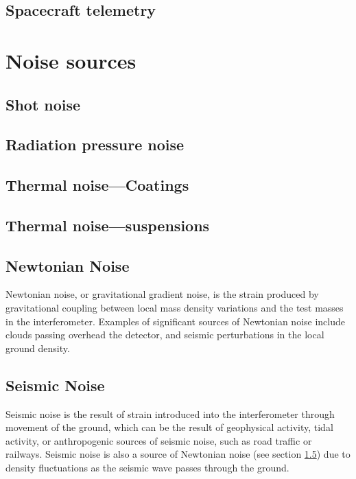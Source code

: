 \documentclass{kentigern}
\begin{document}
\subsection{Spacecraft telemetry}
\label{sec:spacecraft-telemetry}



\section{Noise sources}
\label{sec:an-overview-noise}

\subsection{Shot noise}
\label{sec:shot-noise}

\subsection{Radiation pressure noise}
\label{sec:radi-press-noise}

\subsection{Thermal noise---Coatings}
\label{sec:therm-noise-coat}

\subsection{Thermal noise---suspensions}
\label{sec:therm-noise-susp}


\subsection{Newtonian Noise}
\label{sec:newtonian-noise}

Newtonian noise, or gravitational gradient noise, is the strain
produced by gravitational coupling between local mass density
variations and the test masses in the interferometer. Examples of
significant sources of Newtonian noise include clouds passing overhead
the detector, and seismic perturbations in the local ground density.

\subsection{Seismic Noise}
\label{sec:seismic-noise}

Seismic noise is the result of strain introduced into the
interferometer through movement of the ground, which can be the result
of geophysical activity, tidal activity, or anthropogenic sources of
seismic noise, such as road traffic or railways. Seismic noise is also
a source of Newtonian noise (see section \ref{sec:newtonian-noise})
due to density fluctuations as the seismic wave passes through the
ground.
\end{document}
